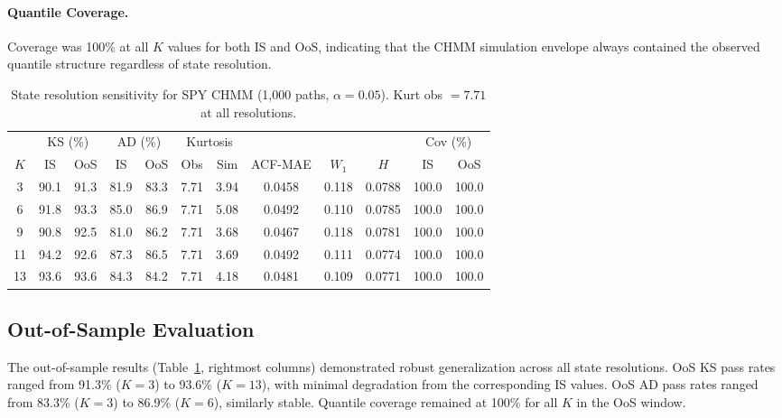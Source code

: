 \paragraph{Quantile Coverage.}
Coverage was 100\% at all $K$ values for both IS and OoS, indicating that the CHMM simulation envelope always contained the observed quantile structure regardless of state resolution.

\begin{table}[t]
\centering
\caption{State resolution sensitivity for SPY CHMM (1,000 paths, $\alpha = 0.05$). Kurt obs $= 7.71$ at all resolutions.}
\label{tab:sensitivity}
\small
\begin{tabular}{c cc cc cc c c c cc}
\toprule
& \multicolumn{2}{c}{KS (\%)} & \multicolumn{2}{c}{AD (\%)} & \multicolumn{2}{c}{Kurtosis} & & & & \multicolumn{2}{c}{Cov (\%)} \\
\cmidrule(lr){2-3} \cmidrule(lr){4-5} \cmidrule(lr){6-7} \cmidrule(lr){11-12}
$K$ & IS & OoS & IS & OoS & Obs & Sim & ACF-MAE & $W_1$ & $H$ & IS & OoS \\
\midrule
3  & 90.1 & 91.3 & 81.9 & 83.3 & 7.71 & 3.94 & 0.0458 & 0.118 & 0.0788 & 100.0 & 100.0 \\
6  & 91.8 & 93.3 & 85.0 & 86.9 & 7.71 & 5.08 & 0.0492 & 0.110 & 0.0785 & 100.0 & 100.0 \\
9  & 90.8 & 92.5 & 81.0 & 86.2 & 7.71 & 3.68 & 0.0467 & 0.118 & 0.0781 & 100.0 & 100.0 \\
11 & 94.2 & 92.6 & 87.3 & 86.5 & 7.71 & 3.69 & 0.0492 & 0.111 & 0.0774 & 100.0 & 100.0 \\
13 & 93.6 & 93.6 & 84.3 & 84.2 & 7.71 & 4.18 & 0.0481 & 0.109 & 0.0771 & 100.0 & 100.0 \\
\bottomrule
\end{tabular}
\end{table}

\subsection{Out-of-Sample Evaluation}
\label{sec:oos}

The out-of-sample results (Table~\ref{tab:sensitivity}, rightmost columns) demonstrated robust generalization across all state resolutions.
OoS KS pass rates ranged from 91.3\% ($K = 3$) to 93.6\% ($K = 13$), with minimal degradation from the corresponding IS values.
OoS AD pass rates ranged from 83.3\% ($K = 3$) to 86.9\% ($K = 6$), similarly stable.
Quantile coverage remained at 100\% for all $K$ in the OoS window.

